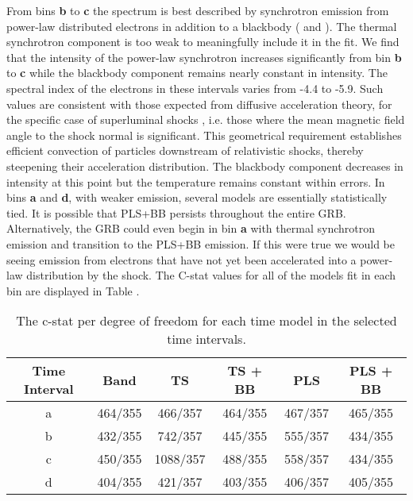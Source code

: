 From bins {\textbf b} to {\textbf c} the spectrum is best described by
synchrotron emission from power-law distributed electrons in addition
to a blackbody ( and
). The thermal synchrotron component is too
weak to meaningfully include it in the fit. We find that the intensity
of the power-law synchrotron increases significantly from bin {\textbf
  b} to {\textbf c} while the blackbody component remains nearly
constant in intensity.  The spectral index of the electrons in these
intervals varies from -4.4 to -5.9.  Such values are consistent with
those expected from diffusive acceleration theory, for the specific
case of superluminal shocks \cite{Baring:2011}, i.e. those where the
mean magnetic field angle to the shock normal is significant. This
geometrical requirement establishes efficient convection of particles
downstream of relativistic shocks, thereby steepening their
acceleration distribution.  The blackbody component decreases in
intensity at this point but the temperature remains constant within
errors.  In bins {\textbf a} and {\textbf d}, with weaker emission,
several models are essentially statistically tied.  It is possible
that PLS+BB persists throughout the entire GRB. Alternatively, the GRB
could even begin in bin {\textbf a} with thermal synchrotron emission
and transition to the PLS+BB emission. If this were true we would be
seeing emission from electrons that have not yet been accelerated into
a power-law distribution by the shock. The C-stat values for all of
the models fit in each bin are displayed in Table .

\begin{table}
\centering
\begin{tabular}{c|c c c c c}
Time Interval & Band & TS & TS + BB & PLS & PLS + BB \\
\hline \hline
a & 464/355 & 466/357 & 464/355 & 467/357 & 465/355 \\

b & 432/355 & 742/357 & 445/355 & 555/357 & 434/355 \\

c & 450/355 & 1088/357 & 488/355 & 558/357 & 434/355 \\

d & 404/355 & 421/357 & 403/355 & 406/357 & 405/355 

\end{tabular}
\caption{The c-stat per degree of freedom for each time model in the selected time intervals.}
\label{tab:table2}
\end{table}

